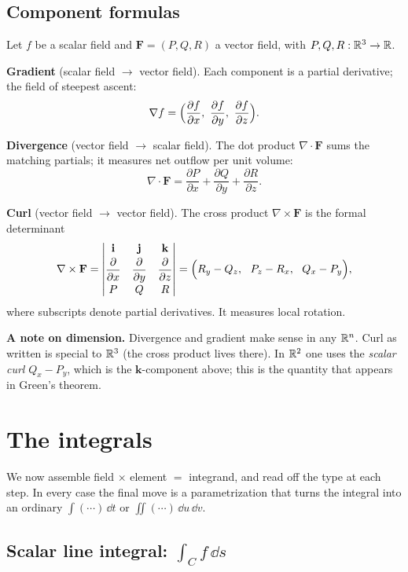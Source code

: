 \documentclass{essay}
\newcommand{\F}{\mathbf{F}}
\begin{document}
\subsection{Component formulas}

Let $f$ be a scalar field and $\F=(P,Q,R)$ a vector field, with $P,Q,R:\mathbb{R}^3\to\mathbb{R}$.

\textbf{Gradient} (scalar field $\to$ vector field). Each component is a partial
derivative; the field of steepest ascent:
\[
\nabla f = \Bigl(\frac{\partial f}{\partial x},\ \frac{\partial f}{\partial y},\
\frac{\partial f}{\partial z}\Bigr).
\]

\textbf{Divergence} (vector field $\to$ scalar field). The dot product
$\nabla\cdot\F$ sums the matching partials; it measures net outflow per unit volume:
\[
\nabla\cdot\F = \frac{\partial P}{\partial x} + \frac{\partial Q}{\partial y}
+ \frac{\partial R}{\partial z}.
\]

\textbf{Curl} (vector field $\to$ vector field). The cross product
$\nabla\times\F$ is the formal determinant
\[
\nabla\times\F =
\begin{vmatrix}
\mathbf{i} & \mathbf{j} & \mathbf{k} \\[2pt]
\dfrac{\partial}{\partial x} & \dfrac{\partial}{\partial y} & \dfrac{\partial}{\partial z} \\[6pt]
P & Q & R
\end{vmatrix}
=\Bigl(R_y - Q_z,\ \ P_z - R_x,\ \ Q_x - P_y\Bigr),
\]
where subscripts denote partial derivatives. It measures local rotation.

\textbf{A note on dimension.} Divergence and gradient make sense in any $\mathbb{R}^n$.
Curl as written is special to $\mathbb{R}^3$ (the cross product lives there). In $\mathbb{R}^2$ one
uses the \emph{scalar curl} $Q_x - P_y$, which is the $\mathbf{k}$-component above;
this is the quantity that appears in Green's theorem.

\section{The integrals}

We now assemble field $\times$ element $=$ integrand, and read off the type at each
step. In every case the final move is a parametrization that turns the integral into
an ordinary $\int(\cdots)\,\dd t$ or $\iint(\cdots)\,\dd u\,\dd v$.

\subsection{Scalar line integral: $\int_C f\,\dd s$}
\end{document}
